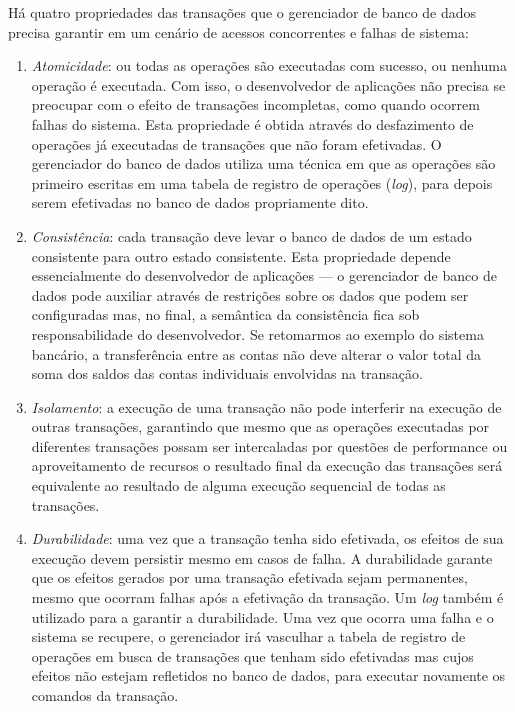 \documentclass[11pt,twoside,a4paper]{book}
\begin{document}
Há quatro propriedades das transações que o gerenciador de banco de dados precisa garantir em um cenário de acessos concorrentes e falhas de sistema:

\begin{enumerate}
\item \emph{Atomicidade}: ou todas as operações são executadas com sucesso, ou nenhuma operação é executada. Com isso, o desenvolvedor de aplicações não precisa se preocupar com o efeito de transações incompletas, como quando ocorrem falhas do sistema. Esta propriedade é obtida através do desfazimento de operações já executadas de transações que não foram efetivadas. O gerenciador do banco de dados utiliza uma técnica em que as operações são primeiro escritas em uma tabela de registro de operações (\emph{log}), para depois serem efetivadas no banco de dados propriamente dito.
\item \emph{Consistência}: cada transação deve levar o banco de dados de um estado consistente para outro estado consistente. Esta propriedade depende essencialmente do desenvolvedor de aplicações --- o gerenciador de banco de dados pode auxiliar através de restrições sobre os dados que podem ser configuradas mas, no final, a semântica da consistência fica sob responsabilidade do desenvolvedor. Se retomarmos ao exemplo do sistema bancário, a transferência entre as contas não deve alterar o valor total da soma dos saldos das contas individuais envolvidas na transação.
\item \emph{Isolamento}: a execução de uma transação não pode interferir na execução de outras transações, garantindo que mesmo que as operações executadas por diferentes transações possam ser intercaladas por questões de performance ou aproveitamento de recursos o resultado final da execução das transações será equivalente ao resultado de alguma execução sequencial de todas as transações.
\item \emph{Durabilidade}: uma vez que a transação tenha sido efetivada, os efeitos de sua execução devem persistir mesmo em casos de falha. A durabilidade garante que os efeitos gerados por uma transação efetivada sejam permanentes, mesmo que ocorram falhas após a efetivação da transação. Um \emph{log} também é utilizado para a garantir a durabilidade. Uma vez que ocorra uma falha e o sistema se recupere, o gerenciador irá vasculhar a tabela de registro de operações em busca de transações que tenham sido efetivadas mas cujos efeitos não estejam refletidos no banco de dados, para executar novamente os comandos da transação.
\end{enumerate}
\end{document}
